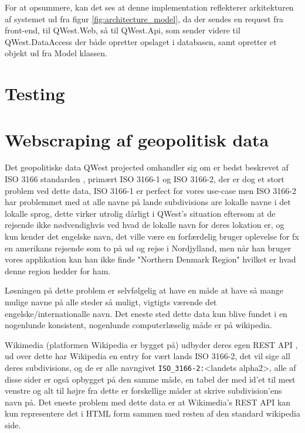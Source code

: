 For at opsummere, kan det ses at denne implementation reflekterer arkitekturen af systemet ud fra figur \ref{fig:architecture_model}, da der sendes en request fra front-end, til QWest.Web, så til QWest.Api, som sender videre til QWest.DataAccess der både opretter opslaget i databasen, samt opretter et objekt ud fra Model klassen.

\section{Testing}\label{sec:testing}

\section{Webscraping af geopolitisk data}\label{sec:datascraping}
Det geopolitiske data QWest projected omhandler sig om er bedst beskrevet af ISO 3166 standarden \cite{ISO3166}, primært ISO 3166-1 og ISO 3166-2, der er dog et stort problem ved dette data, ISO 3166-1 er perfect for vores use-case men ISO 3166-2 har problemmet med at alle navne på lande subdivisions are lokalle navne i det lokalle sprog, dette virker utrolig dårligt i QWest's situation eftersom at de rejsende ikke nødvendighvis ved hvad de lokalle navn for deres lokation er, og kun kender det engelske navn, det ville være en forfærdelig bruger oplevelse for fx en amerikans rejsende som to på ud og rejse i Nordjylland, men når han bruger vores applikation kan han ikke finde "Northern Denmark Region" hvilket er hvad denne region hedder for ham.

Løsningen på dette problem er selvfølgelig at have en måde at have så mange mulige navne på alle steder så muligt, vigtigts værende det engelske/internationalle navn. Det eneste sted dette data kun blive fundet i en nogenlunde konsistent, nogenlunde computerlæselig måde er på wikipedia.

Wikimedia (platformen Wikipedia er bygget på) udbyder deres egen REST API \cite{Wikimedia-REST-API-Documentation}, ud over dette har Wikipedia en entry for vært lands ISO 3166-2, det vil sige all deres subdivisions, og de er alle navngivet \texttt{ISO\_3166-2:}<landets alpha2>, alle af disse sider er også opbygget på den samme måde, en tabel der med id'et til mest venstre og alt til højre fra dette er forskellige måder at skrive subdivision'ens navn på. Det eneste problem med dette data er at Wikimedia's REST API kan kun representere det i HTML form sammen med resten af den standard wikipedia side.

